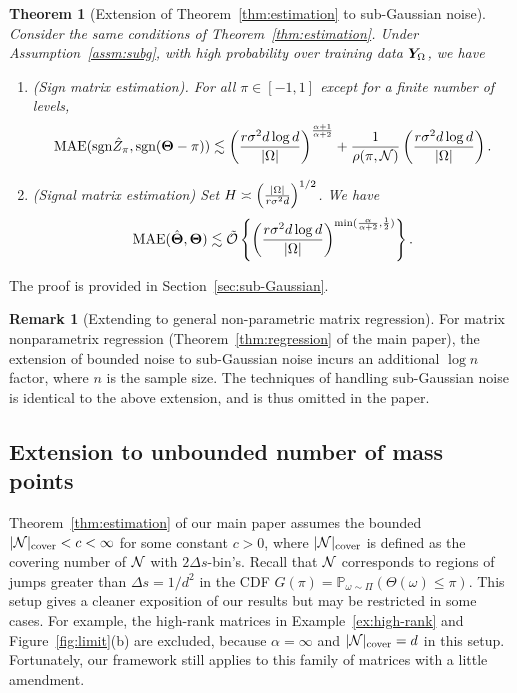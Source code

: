 \documentclass[11pt]{article}
\theoremstyle{plain}
\newtheorem{thm}{Theorem}[subsection]
\theoremstyle{definition}
\newtheorem{rmk}{Remark}
\def\sign{\textup{sgn}}
\begin{document}
\begin{thm}[Extension of Theorem~\ref{thm:estimation} to sub-Gaussian noise]\label{thm:extension_gaussian} Consider the same conditions of Theorem~\ref{thm:estimation}. Under Assumption~\ref{assm:subg}, with high probability over training data $\bm Y_{\Omega}$, we have
\begin{enumerate}
\item [(a)](Sign matrix estimation). For all $\pi\in [-1,1]$ except for a finite number of levels,
\begin{equation}\label{eq:matrix_sign}
 \textup{MAE}(\sign \hat Z_\pi,\sign (\mTheta-\pi))\lesssim \left({r \sigma^2d\log d \over |\Omega|}\right)^{\alpha+1\over \alpha+2}+{1\over \rho(\pi,\tN)}\left({r \sigma^2d\log d \over |\Omega|}\right).
\end{equation}
\item [(b)](Signal matrix estimation) Set $H\asymp \left({ |\Omega|\over r \sigma^2d}\right)^{1/2}$. We have
\[
 \textup{MAE}(\hat {\bm{\Theta}},\bm{\Theta})\lesssim \tilde {\mathcal{O}}\left\{\left({r \sigma^2d\log d\over |\Omega|}\right)^{\min({\alpha\over\alpha+2},\frac{1}{2})}\right\}.
\]
\end{enumerate}
\end{thm}
The proof is provided in Section~\ref{sec:sub-Gaussian}.  

\begin{rmk}[Extending to general non-parametric matrix regression] For matrix nonparametrix regression (Theorem~\ref{thm:regression} of the main paper), the extension of bounded noise to sub-Gaussian noise incurs an additional $\log n$ factor, where $n$ is the sample size. The techniques of handling sub-Gaussian noise is identical to the above extension, and is thus omitted in the paper. 
\end{rmk}

\subsection{Extension to unbounded number of mass points}\label{eq:unbounded}
Theorem~\ref{thm:estimation} of our main paper assumes the bounded $|\mathcal{N}|_{\text{cover}}<c<\infty$ for some constant $c>0$, where $|\mathcal{N}|_{\text{cover}}$ is defined as the covering number of $\mathcal{N}$ with $2\Delta s$-bin's. Recall that $\mathcal{N}$ corresponds to regions of jumps greater than $\Delta s = {1/d^2}$ in the CDF $G(\pi)=\mathbb{P}_{\omega\sim \Pi}(\Theta(\omega)\leq \pi)$. This setup gives a cleaner exposition of our results but may be restricted in some cases. For example, the high-rank matrices in Example~\ref{ex:high-rank} and Figure~\ref{fig:limit}(b) are excluded, because $\alpha=\infty$ and $|\mathcal{N}|_{\text{cover}}=d$ in this setup. Fortunately, our framework still applies to this family of matrices with a little amendment. 
\end{document}
